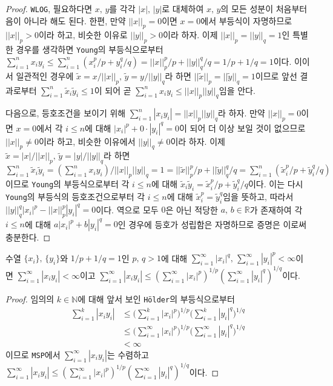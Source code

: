\begin{proof}
    \texttt{WLOG}, 필요하다면 $x,\,y$를 각각 $|x|,\,|y|$로 대체하여 $x,\,y$의 모든 성분이 처음부터 음이 아니라 해도 된다. 한편, 만약 $||x||_p=0$이면 $x=0$에서 부등식이 자명하므로 $||x||_p>0$이라 하고, 비슷한 이유로 $||y||_p>0$이라 하자. 이제 $||x||_p=||y||_q=1$인 특별한 경우를 생각하면 \texttt{Young}의 부등식으로부터 $\sum_{i=1}^nx_iy_i\leq\sum_{i=1}^n(x_i^p/p+y_i^q/q)=||x||_p^p/p+||y||_q^q/q=1/p+1/q=1$이다. 이이서 일관적인 경우에 $\widetilde{x}=x/||x||_p,\,\widetilde{y}=y/||y||_q$라 하면 $||\widetilde{x}||_p=||\widetilde{y}||_q=1$이므로 앞선 결과로부터 $\sum_{i=1}^n\widetilde{x}_i\widetilde{y}_i\leq1$이 되어 곧 $\sum_{i=1}^nx_iy_i\leq||x||_p||y||_q$임을 안다.

    다음으로, 등호조건을 보이기 위해 $\sum_{i=1}^n|x_iy_i|=||x||_p||y||_q$라 하자. 만약 $||x||_p=0$이면 $x=0$에서 각 $i\leq n$에 대해 $|x_i|^p+0\cdot|y_i|^q=0$이 되어 더 이상 보일 것이 없으므로 $||x||_p\ne0$이라 하고, 비슷한 이유에서 $||y||_q\ne0$이라 하자. 이제 $\widetilde{x}=|x|/||x||_p,\,\widetilde{y}=|y|/||y||_q$라 하면 $\sum_{i=1}^n\widetilde{x}_i\widetilde{y}_i=(\sum_{i=1}^nx_iy_i)/||x||_p||y||_q=1=||\widetilde{x}||_p^p/p+||\widetilde{y}||_q^q/q=\sum_{i=1}^n(\widetilde{x}_i^p/p+\widetilde{y}_i^q/q)$이므로 \texttt{Young}의 부등식으로부터 각 $i\leq n$에 대해 $\widetilde{x}_i\widetilde{y}_i=\widetilde{x}_i^p/p+\widetilde{y}_i^q/q$이다. 이는 다시 \texttt{Young}의 부등식의 등호조건으로부터 각 $i\leq n$에 대해 $\widetilde{x}_i^p=\widetilde{y}_i^q$임을 뜻하고, 따라서 $||y||_q^q|x_i|^p-||x||_p^p|y_i|^q=0$이다. 역으로 모두 $0$은 아닌 적당한 $a,\,b\in\mathbb{R}$가 존재하여 각 $i\leq n$에 대해 $a|x_i|^p+b|y_i|^q=0$인 경우에 등호가 성립함은 자명하므로 증명은 이로써 충분한다.
\end{proof}

\begin{corollary}
    수열 $\{x_i\},\,\{y_i\}$와 $1/p+1/q=1$인 $p,\,q>1$에 대해 $\sum_{i=1}^\infty|x_i|^q,\,\sum_{i=1}^\infty|y_i|^p<\infty$이면 $\sum_{i=1}^\infty|x_iy_i|<\infty$이고 $\sum_{i=1}^\infty|x_iy_i|\leq(\sum_{i=1}^\infty|x_i|^p)^{1/p}(\sum_{i=1}^\infty|y_i|^q)^{1/q}$이다.
\end{corollary}

\begin{proof}
    임의의 $k\in\mathbb{N}$에 대해 앞서 보인 \texttt{H\"older}의 부등식으로부터
    \begin{align*}
        \sum_{i=1}^k|x_iy_i|&\leq\bigg(\sum_{i=1}^k|x_i|^p\bigg)^{1/p}\bigg(\sum_{i=1}^k|y_i|^q\bigg)^{1/q}\\
        &\leq\bigg(\sum_{i=1}^\infty|x_i|^p\bigg)^{1/p}\bigg(\sum_{i=1}^\infty|y_i|^q\bigg)^{1/q}\\
        &<\infty
    \end{align*}
    이므로 \texttt{MSP}에서 $\sum_{i=1}^\infty|x_iy_i|$는 수렴하고 $\sum_{i=1}^\infty|x_iy_i|\leq(\sum_{i=1}^\infty|x_i|^p)^{1/p}(\sum_{i=1}^\infty|y_i|^q)^{1/q}$이다.
\end{proof}

